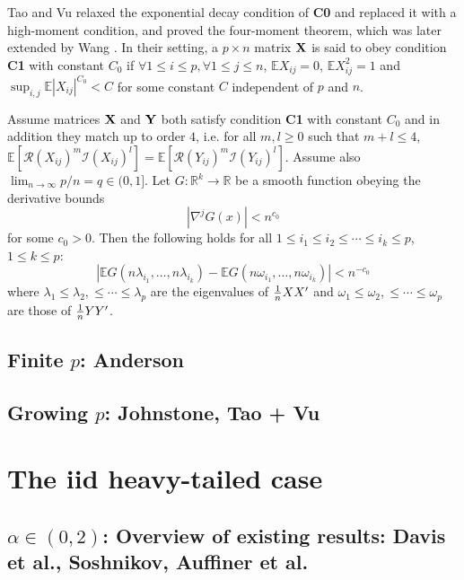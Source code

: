 \documentclass[11pt,reqno]{amsart}
\newcommand{\E}{\mathbb{E}}
\newcommand{\1}{\mathds{1}}
\newcommand{\0}{\boldsymbol{0}}
\newcommand{\4}{\mathchoice{\mskip1.5mu}{\mskip1.5mu}{}{}}
\newcommand{\5}{\mathchoice{\mskip-1.5mu}{\mskip-1.5mu}{}{}}
\newcommand{\2}{\penalty250\mskip\thickmuskip\mskip-\thinmuskip} %
\begin{document}
Tao and Vu \cite{tao:vu:2012} relaxed the exponential decay condition
of {\bf C0} and replaced it with a high-moment condition, and proved the
four-moment theorem, which was later extended by Wang
\cite{Wang:2012}. In their setting, a $p \times n$ matrix $\bf X$ is
said to obey condition {\bf C1} with constant $C_0$ if $\forall 1
\leq i \leq p, \forall 1 \leq j \leq n$, $\E X_{ij} = 0$, $\E
X_{ij}^2 = 1 $ and $\sup_{i,j} \E|X_{ij}|^{C_0} < C$ for some constant
$C$ independent of $p$ and $n$.

Assume matrices $\bf X$ and $\bf Y$ both satisfy condition {\bf C1}
with constant $C_0$ and in addition they match up to order $4$,
i.e. for all $m, l \geq 0$ such that $m + l \leq 4$, $\E[\mathscr{
R}(X_{ij})^m \mathscr{I}(X_{ij})^l] = \E[\mathscr{R}(Y_{ij})^m
\mathscr{I}(Y_{ij})^l]$. Assume also $\lim_{n \to \infty} p/n = q \in
(0, 1]$. Let $G: \mathbb R^k \to \mathbb R$ be a smooth function
obeying the derivative bounds
\[
\left| \nabla^j G(x) \right| < n^{c_0}
\]
for some $c_0 > 0$. Then the following holds for all $1 \leq i_1 \leq
i_2 \leq \cdots \leq i_{k} \leq p$, $1 \leq k \leq p$:
\[
\left|
\E G(n\lambda_{i_1}, \dots, n\lambda_{i_k}) - 
\E G(n\omega_{i_1}, \dots, n\omega_{i_k})
\right| < n^{- c_0}
\]
where $\lambda_1 \leq \lambda_2, \leq \cdots \leq \lambda_p$ are the
eigenvalues of ${1 \over n} XX'$ and $\omega_1 \leq \omega_2, \leq
\cdots \leq \omega_p$ are those of ${1 \over n} YY'$.

\subsection{Finite $p$: Anderson}
\subsection{Growing $p$: Johnstone, Tao + Vu}

\section{The iid heavy-tailed case}

\subsection{$\alpha \in (0,2)$: Overview of existing results: Davis et
  al., Soshnikov, Auffiner et al.}
\end{document}
